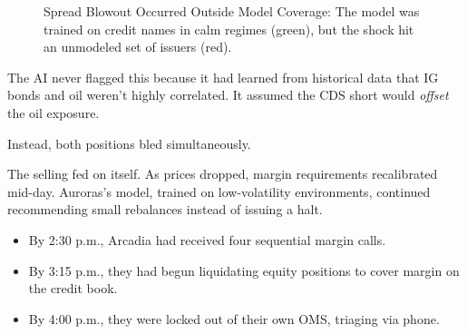 \begin{figure}[H]
  \centering
  \caption{Spread Blowout Occurred Outside Model Coverage: The model was trained on credit names in calm regimes (green), but the shock hit an unmodeled set of issuers (red).}
\end{figure}

\medskip

The AI never flagged this because it had learned from historical data that IG bonds and oil weren’t highly correlated.  
It assumed the CDS short would \textit{offset} the oil exposure.

Instead, both positions bled simultaneously.

The selling fed on itself.  
As prices dropped, margin requirements recalibrated mid-day.  
Auroras’s model, trained on low-volatility environments, continued recommending small rebalances instead of issuing 
a halt.

\begin{itemize}
  \item By 2:30 p.m., Arcadia had received four sequential margin calls.  
  \item By 3:15 p.m., they had begun liquidating equity positions to cover margin on the credit book.  
  \item By 4:00 p.m., they were locked out of their own OMS, triaging via phone.
\end{itemize}

